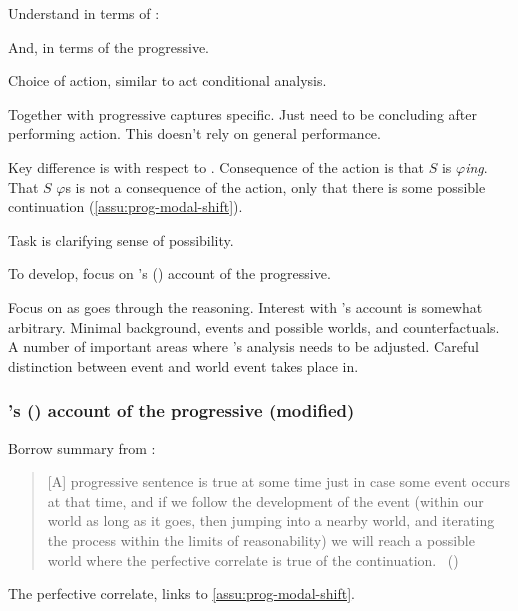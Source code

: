 \begin{note}
  Understand \fc{} in terms of :
  \begin{quote}
  \end{quote}
  And,  in terms of the progressive.
  \begin{quote}
  \end{quote}
  Choice of action, similar to act conditional analysis.

  Together with progressive captures specific.
  Just need to be concluding after performing action.
  This doesn't rely on general performance.

  Key difference is with respect to \AbControl{}.
  Consequence of the action is that \(S\) is \(\varphi\)\emph{ing}.
  That \(S\) \(\varphi\)s is not a consequence of the action, only that there is some possible continuation (\autoref{assu:prog-modal-shift}).

  Task is clarifying sense of possibility.

  To develop, focus on \citeauthor{Landman:1992wh}'s (\citeyear{Landman:1992wh}) account of the progressive.

  Focus on \citeauthor{Landman:1992wh} as goes through the reasoning.
  Interest with \citeauthor{Landman:1992wh}'s account is somewhat arbitrary.
  Minimal background, events and possible worlds, and counterfactuals.
  A number of important areas where \citeauthor{Landman:1992wh}'s analysis needs to be adjusted.
  Careful distinction between event and world event takes place in.
\end{note}


\subsubsection[\citeauthor{Landman:1992wh}'s account of the progressive (modified)]{\citeauthor{Landman:1992wh}'s (\citeyear{Landman:1992wh}) account of the progressive (modified)}
\label{cha:sec:fcs-def:progressive-landman}
\nocite{Portner:1998um}
\nocite{Engelberg:1999vi}


\begin{note}
  Borrow summary from \textcite{Szabo:2004ul}:
  \begin{quote}
    [A] progressive sentence is true at some time just in case some event occurs at that time, and if we follow the development of the event (within our world as long as it goes, then jumping into a nearby world, and iterating the process within the limits of reasonability) we will reach a possible world where the perfective correlate is true of the continuation.%
    \mbox{ }\hfill\mbox{(\citeyear[34]{Szabo:2004ul})}
  \end{quote}
  The perfective correlate, links to \autoref{assu:prog-modal-shift}.
\end{note}

